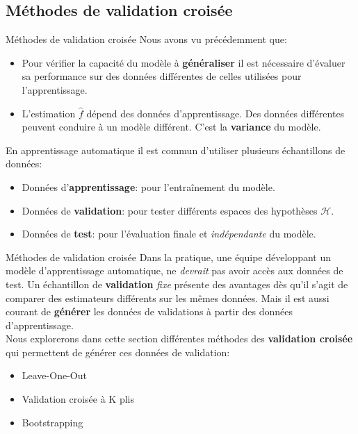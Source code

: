 \subsection[Méthodes de validation croisée]{Méthodes de validation croisée}

\begin{frame}{Méthodes de validation croisée}
	Nous avons vu précédemment que:
	\begin{itemize}
		\item Pour vérifier la capacité du modèle à \textbf{généraliser} il est nécessaire d'évaluer sa performance sur des données différentes de celles utilisées pour l'apprentissage.
		\item L'estimation $\hat{f}$ dépend des données d'apprentissage. Des données différentes peuvent conduire à un modèle différent. C'est la \textbf{variance} du modèle.
	\end{itemize}
	\pause
	\vspace{0.5cm}
	En apprentissage automatique il est commun d'utiliser plusieurs échantillons de données:
	\begin{itemize}
		\item Données d'\textbf{apprentissage}: pour l'entraînement du modèle.
		\item Données de \textbf{validation}: pour tester différents espaces des hypothèses $\mathcal{H}$.
		\item Données de \textbf{test}: pour l'évaluation finale et \textit{indépendante} du modèle.
	\end{itemize}
\end{frame}

\begin{frame}{Méthodes de validation croisée}
	Dans la pratique, une équipe développant un modèle d'apprentissage automatique, ne \textit{devrait} pas avoir accès aux données de test. Un échantillon de \textbf{validation} \textit{fixe} présente des avantages dès qu'il s'agit de comparer des estimateurs différents sur les mêmes données. Mais il est aussi courant de \textbf{générer} les données de validations à partir des données d'apprentissage. \\
	\pause
	\vspace{0.5cm}
	Nous explorerons dans cette section différentes méthodes des \textbf{validation croisée} qui permettent de générer ces données de validation:
	\begin{itemize}
		\item Leave-One-Out
		\item Validation croisée à K plis
		\item Bootstrapping
	\end{itemize}
\end{frame}

